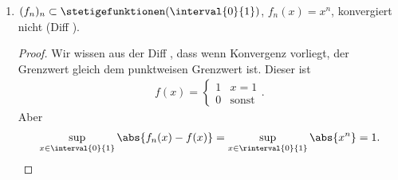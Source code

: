 \begin{beispiele}
\begin{enumerate}
\begin{enumerate}[label=\textbf{\arabic*. Beh}]
\begin{proof}
                
            \end{proof}
            
            \item \( (f_n)_n\subset \stetigefunktionen(\interval{0}{1}) \), \( f_n(x)=x^n \), konvergiert nicht (\vgl Diff ).
            \begin{proof}
                Wir wissen aus der Diff , dass wenn Konvergenz vorliegt, der Grenzwert gleich dem punktweisen Grenzwert ist. Dieser ist
                \begin{align*}
                    f(x)=\begin{cases}
                        1 & x=1\\
                        0 & \text{sonst}
                    \end{cases}.
                \end{align*}
                Aber
                \begin{align*}
                    \sup_{x\in \interval{0}{1}}\abs{f_n(x)-f(x)}=\sup_{x\in \rinterval{0}{1}}\abs{x^n}=1.
                \end{align*}
            \end{proof}
            

\end{enumerate}
\end{enumerate}
\end{beispiele}
